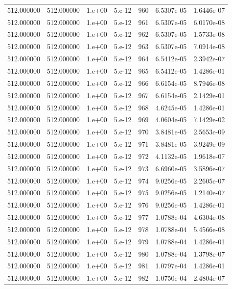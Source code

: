 \begin{table}[htbp]
\begin{tabular}{rrrrrrr}
512.000000 & 512.000000 & 1.e+00 & 5.e-12 & 960 & 6.5307e-05 & 1.6446e-07 \\
512.000000 & 512.000000 & 1.e+00 & 5.e-12 & 961 & 6.5307e-05 & 6.0170e-08 \\
512.000000 & 512.000000 & 1.e+00 & 5.e-12 & 962 & 6.5307e-05 & 1.5733e-08 \\
512.000000 & 512.000000 & 1.e+00 & 5.e-12 & 963 & 6.5307e-05 & 7.0914e-08 \\
512.000000 & 512.000000 & 1.e+00 & 5.e-12 & 964 & 6.5412e-05 & 2.3942e-07 \\
512.000000 & 512.000000 & 1.e+00 & 5.e-12 & 965 & 6.5412e-05 & 1.4286e-01 \\
512.000000 & 512.000000 & 1.e+00 & 5.e-12 & 966 & 6.6154e-05 & 8.7946e-08 \\
512.000000 & 512.000000 & 1.e+00 & 5.e-12 & 967 & 6.6154e-05 & 2.1429e-01 \\
512.000000 & 512.000000 & 1.e+00 & 5.e-12 & 968 & 4.6245e-05 & 1.4286e-01 \\
512.000000 & 512.000000 & 1.e+00 & 5.e-12 & 969 & 4.0604e-05 & 7.1429e-02 \\
512.000000 & 512.000000 & 1.e+00 & 5.e-12 & 970 & 3.8481e-05 & 2.5653e-09 \\
512.000000 & 512.000000 & 1.e+00 & 5.e-12 & 971 & 3.8481e-05 & 3.9249e-09 \\
512.000000 & 512.000000 & 1.e+00 & 5.e-12 & 972 & 4.1132e-05 & 1.9618e-07 \\
512.000000 & 512.000000 & 1.e+00 & 5.e-12 & 973 & 6.6960e-05 & 3.5896e-07 \\
512.000000 & 512.000000 & 1.e+00 & 5.e-12 & 974 & 9.0256e-05 & 2.2605e-07 \\
512.000000 & 512.000000 & 1.e+00 & 5.e-12 & 975 & 9.0256e-05 & 1.2140e-07 \\
512.000000 & 512.000000 & 1.e+00 & 5.e-12 & 976 & 9.0256e-05 & 1.4286e-01 \\
512.000000 & 512.000000 & 1.e+00 & 5.e-12 & 977 & 1.0788e-04 & 4.6304e-08 \\
512.000000 & 512.000000 & 1.e+00 & 5.e-12 & 978 & 1.0788e-04 & 5.4566e-08 \\
512.000000 & 512.000000 & 1.e+00 & 5.e-12 & 979 & 1.0788e-04 & 1.4286e-01 \\
512.000000 & 512.000000 & 1.e+00 & 5.e-12 & 980 & 1.0788e-04 & 1.3798e-07 \\
512.000000 & 512.000000 & 1.e+00 & 5.e-12 & 981 & 1.0797e-04 & 1.4286e-01 \\
512.000000 & 512.000000 & 1.e+00 & 5.e-12 & 982 & 1.0750e-04 & 2.4804e-07 \\

\end{tabular}
\end{table}
